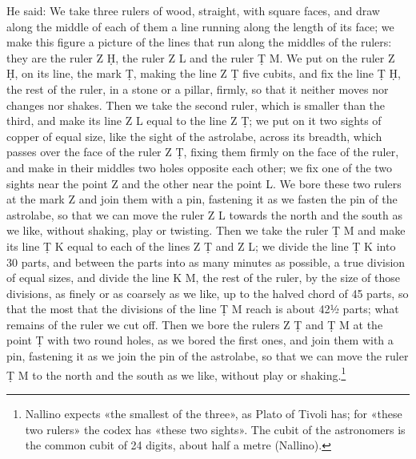 \documentclass[11pt]{article}
\newcommand{\ArPage}[1]{\marginpar{\footnotesize\color{gray}Ar.\,p.\,#1}}
\begin{document}
\par \ArPage{217}He said: We take three rulers of wood, straight, with square faces, and draw along the middle of each of them a line running along the length of its face; we make this figure a picture of the lines that run along the middles of the rulers: they are the ruler Z Ḥ, the ruler Z L and the ruler Ṭ M. We put on the ruler Z Ḥ, on its line, the mark Ṭ, making the line Z Ṭ five cubits, and fix the line Ṭ Ḥ, the rest of the ruler, in a stone or a pillar, firmly, so that it neither moves nor changes nor shakes. Then we take the second ruler, which is smaller than the third, and make its line Z L equal to the line Z Ṭ; we put on it two sights of copper of equal size, like the sight of the astrolabe, across its breadth, which passes over the face of the ruler Z Ṭ, fixing them firmly on the face of the ruler, and make in their middles two holes opposite each other; we fix one of the two sights near the point Z and the other near the point L. We bore these two rulers at the mark Z and join them with a pin, fastening it as we fasten the pin of the astrolabe, so that we can move the ruler Z L towards the north and the south as we like, without shaking, play or twisting. Then we take the ruler Ṭ M and make its line Ṭ K equal to each of the lines Z Ṭ and Z L; we divide the line Ṭ K into 30 parts, and between the parts into as many minutes as possible, a true division of equal sizes, and divide the line K M, the rest of the ruler, by the size of those divisions, as finely or as coarsely as we like, up to the halved chord of 45 parts, so that the most that the divisions of the line Ṭ M reach is about 42½ parts; what remains of the ruler we cut off. Then we bore the rulers Z Ṭ and Ṭ M at the point Ṭ with two round holes, as we bored the first ones, and join them with a pin, fastening it as we join the pin of the astrolabe, so that we can move the ruler Ṭ M to the north and the south as we like, without play or shaking.\footnote{Nallino expects «the smallest of the three», as Plato of Tivoli has; for «these two rulers» the codex has «these two sights». The cubit of the astronomers is the common cubit of 24 digits, about half a metre (Nallino).}\par
\end{document}
